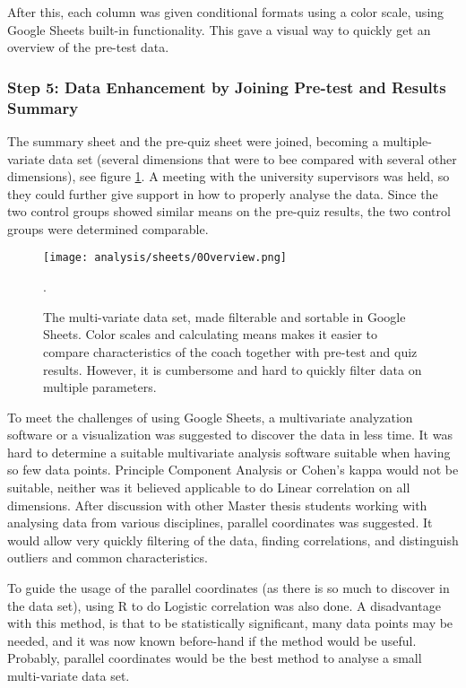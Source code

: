 After this, each column was given conditional formats using a color scale, using Google Sheets built-in functionality. This gave a visual way to quickly get an overview of the pre-test data.

\subsubsection{Step 5: Data Enhancement by Joining Pre-test and Results Summary}

The summary sheet and the pre-quiz sheet were joined, becoming a multiple-variate data set (several dimensions that were to bee compared with several other dimensions), see figure \ref{fig:analysFarg3}. A meeting with the university supervisors was held, so they could further give support in how to properly analyse the data. Since the two control groups showed similar means on the pre-quiz results, the two control groups were determined comparable.

\begin{figure}[h]
    \centering
    \texttt{[image: analysis/sheets/0Overview.png]}
    \caption{The multi-variate data set, made filterable and sortable in Google Sheets. Color scales and calculating means makes it easier to compare characteristics of the coach together with pre-test and quiz results. However, it is cumbersome and hard to quickly filter data on multiple parameters.}.
    \label{fig:analysFarg3}
\end{figure}

To meet the challenges of using Google Sheets, a multivariate analyzation software or a visualization was suggested to discover the data in less time. It was hard to determine a suitable multivariate analysis software suitable when having so few data points. Principle Component Analysis or Cohen's kappa would not be suitable, neither was it believed applicable to do Linear correlation on all dimensions. After discussion with other Master thesis students working with analysing data from various disciplines, parallel coordinates was suggested. It would allow very quickly filtering of the data, finding correlations, and distinguish outliers and common characteristics.

To guide the usage of the parallel coordinates (as there is so much to discover in the data set), using R to do Logistic correlation was also done. A disadvantage with this method, is that to be statistically significant, many data points may be needed, and it was now known before-hand if the method would be useful. Probably, parallel coordinates would be the best method to analyse a small multi-variate data set.


